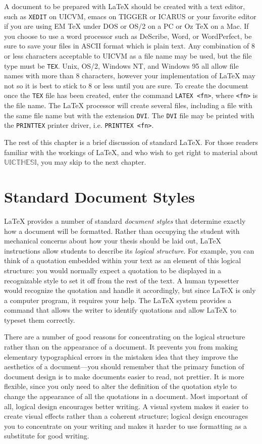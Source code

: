 \documentclass{uicthesi}
\newcommand{\uicthesi}{{$\mathbb{UICTHESI}$}}
\begin{document}
A document to be prepared with \LaTeX{} should be created
with a text editor, such as {\tt XEDIT} on UICVM, {\ttfamily
 emacs} on TIGGER or ICARUS or your favorite editor if you are
using EM \TeX{} under DOS or OS/2 on a PC or Oz \TeX{} on a Mac.
If you choose to use a word processor such as DeScribe, Word, or
WordPerfect, be sure to save your files in ASCII format which is
plain text.
Any combination of 8 or less characters acceptable to UICVM as
a file name may be used, but the file type must be {\tt TEX}. Unix,
OS/2, Windows NT, and Windows 95 all allow file names with more
than 8 characters, however your implementation of \LaTeX{} may not
so it is best to stick to 8 or less until you are sure.
To create the document once the {\tt TEX} file has been created,
enter the command \verb+LATEX <fn>+, where \verb+<fn>+ is the
file name.  The \LaTeX{} processor will create several files,
including a file with the same file name but with the extension
\verb+DVI+.  The \verb+DVI+ file may be printed with the
\verb+PRINTTEX+ printer driver, i.e.{} \verb+PRINTTEX <fn>+.
 
The rest of this chapter is a brief discussion of standard \LaTeX{}.
For those readers familiar with the workings of \LaTeX{}, and
who wish to get right to material about \uicthesi{}, you may
skip to the next chapter.
 
\section{Standard Document Styles}
\LaTeX{} provides a number of standard {\em document styles\/}
that determine exactly how a document will be formatted.
Rather than occupying the student with mechanical concerns about
how your thesis should be laid out, \LaTeX{} instructions allow students
to describe its {\em logical structure\/}.
For example, you can think of a quotation embedded within your
text as an element of this logical structure: you would normally expect
a quotation to be displayed in a recognizable style to set it
off from the rest of the text.
A human typesetter would recognize the quotation and handle
it accordingly, but since \LaTeX{} is only a computer program,
it requires your help.
The \LaTeX{} system provides a command that allows the writer to
identify quotations and allow \LaTeX{} to typeset them correctly.
 
There are a number of good reasons for concentrating on the logical
structure rather than on the appearance of a document.  It prevents
you from making elementary typographical errors in the mistaken
idea that they improve the aesthetics of a document---you should
remember that the primary function of document design is to make
documents easier to read, not prettier.  It is more flexible, since
you only need to alter the definition of the quotation style
to change the appearance of all the quotations in a document.  Most
important of all, logical design encourages better writing.
A visual system makes it easier to create visual effects rather than
a coherent structure; logical design encourages you to concentrate on
your writing and makes it harder to use formatting as a substitute
for good writing.
 
\end{document}
